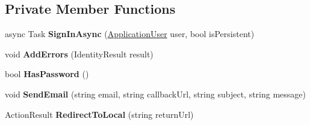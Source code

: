\subsection*{Private Member Functions}
\begin{DoxyCompactItemize}
\item 
async Task {\bfseries Sign\+In\+Async} (\hyperlink{class_p_c_builder_m_v_c_1_1_models_1_1_application_user}{Application\+User} user, bool is\+Persistent)\hypertarget{class_p_c_builder_m_v_c_1_1_controllers_1_1_account_controller_afb3adb4d6e2dd57c0551e4853abd26fe}{}\label{class_p_c_builder_m_v_c_1_1_controllers_1_1_account_controller_afb3adb4d6e2dd57c0551e4853abd26fe}

\item 
void {\bfseries Add\+Errors} (Identity\+Result result)\hypertarget{class_p_c_builder_m_v_c_1_1_controllers_1_1_account_controller_a6ebea49c8114af9e18f742c7f57ce7a6}{}\label{class_p_c_builder_m_v_c_1_1_controllers_1_1_account_controller_a6ebea49c8114af9e18f742c7f57ce7a6}

\item 
bool {\bfseries Has\+Password} ()\hypertarget{class_p_c_builder_m_v_c_1_1_controllers_1_1_account_controller_a0520a211ff47b1b31296215a75b2edd8}{}\label{class_p_c_builder_m_v_c_1_1_controllers_1_1_account_controller_a0520a211ff47b1b31296215a75b2edd8}

\item 
void {\bfseries Send\+Email} (string email, string callback\+Url, string subject, string message)\hypertarget{class_p_c_builder_m_v_c_1_1_controllers_1_1_account_controller_a21e5ebc02425bba4b3d2eef5bc47447a}{}\label{class_p_c_builder_m_v_c_1_1_controllers_1_1_account_controller_a21e5ebc02425bba4b3d2eef5bc47447a}

\item 
Action\+Result {\bfseries Redirect\+To\+Local} (string return\+Url)\hypertarget{class_p_c_builder_m_v_c_1_1_controllers_1_1_account_controller_a68ee6edabbc6c6090bd29c59797e0e0c}{}\label{class_p_c_builder_m_v_c_1_1_controllers_1_1_account_controller_a68ee6edabbc6c6090bd29c59797e0e0c}

\end{DoxyCompactItemize}
